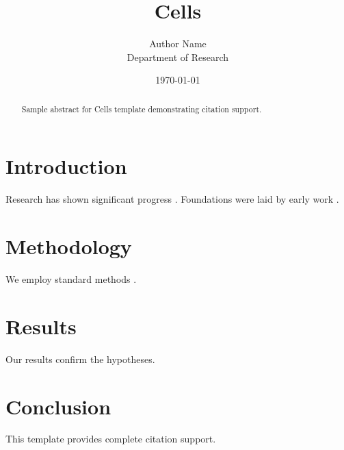 \documentclass{mdpi}
\title{Cells}
\author{Author Name \\ \small Department of Research}
\date{\today}
\begin{document}
\maketitle

\begin{abstract}
Sample abstract for Cells template demonstrating citation support.
\end{abstract}

\section{Introduction}
Research has shown significant progress \citep{einstein1905}. Foundations were laid by early work \citep{turing1950}.

\section{Methodology}
We employ standard methods \citep{knuth1984}.

\section{Results}
Our results confirm the hypotheses.

\section{Conclusion}
This template provides complete citation support.



\end{document}
